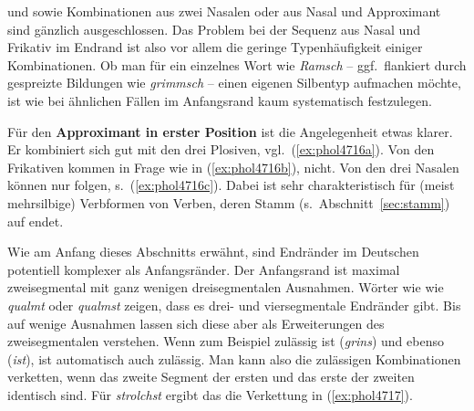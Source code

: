 \begin{exe}
  \ex\label{ex:phol4715}
  \begin{xlist}
  \end{xlist}
\end{exe}

\textipa{[mf]} und \textipa{[Nf]} sowie Kombinationen aus zwei Nasalen oder aus Nasal und Approximant sind gänzlich ausgeschlossen.
Das Problem bei der Sequenz aus Nasal und Frikativ im Endrand ist also vor allem die geringe Typenhäufigkeit einiger Kombinationen.
Ob man \zB für ein einzelnes Wort wie \textit{Ramsch} -- ggf.\ flankiert durch gespreizte Bildungen wie \textit{grimmsch} -- einen eigenen Silbentyp aufmachen möchte, ist wie bei ähnlichen Fällen im Anfangsrand kaum systematisch festzulegen.

Für den \textbf{Approximant in erster Position} ist die Angelegenheit etwas klarer.
Er kombiniert sich gut mit den drei Plosiven, vgl.\ (\ref{ex:phol4716a}).
Von den Frikativen kommen \textipa{[f s \c{c}]} in Frage wie in (\ref{ex:phol4716b}), \textipa{[S X K]} nicht.
Von den drei Nasalen können nur \textipa{[m n]} folgen, s.\ (\ref{ex:phol4716c}).
Dabei ist \textipa{[ln]} sehr charakteristisch für (meist mehrsilbige) Verbformen von Verben, deren Stamm (s.\ Abschnitt~\ref{sec:stamm}) auf \textipa{[l]} endet.

\begin{exe}
  \ex\label{ex:phol4716}
  \begin{xlist}
  \end{xlist}
\end{exe}

Wie am Anfang dieses Abschnitts erwähnt, sind Endränder im Deutschen potentiell komplexer als Anfangsränder.
Der Anfangsrand ist maximal zweisegmental mit ganz wenigen dreisegmentalen Ausnahmen.
Wörter wie wie \textit{qualmt} \textipa{[kvalmt]} oder \textit{qualmst} \textipa{[kvalmst]} zeigen, dass es drei- und viersegmentale Endränder gibt.
Bis auf wenige Ausnahmen lassen sich diese aber als Erweiterungen des zweisegmentalen verstehen.
Wenn zum Beispiel \textipa{[ns]} zulässig ist (\textit{grins}) und \textipa{[st]} ebenso (\textit{ist}), ist automatisch auch \textipa{[nst]} zulässig.
Man kann also die zulässigen Kombinationen verketten, wenn das zweite Segment der ersten und das erste der zweiten identisch sind.
Für \textit{strolchst} ergibt das die Verkettung in (\ref{ex:phol4717}).

